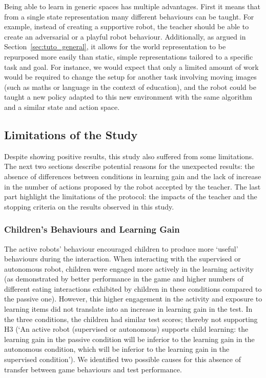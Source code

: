 Being able to learn in generic spaces has multiple advantages. First it means that from a single state representation many different behaviours can be taught. For example, instead of creating a supportive robot, the teacher should be able to create an adversarial or a playful robot behaviour. Additionally, as argued in Section~\ref{sec:tuto_general}, it allows for the world representation to be repurposed more easily than static, simple representations tailored to a specific task and goal. For instance, we would expect that only a limited amount of work would be required to change the setup for another task involving moving images (such as maths or language in the context of education), and the robot could be taught a new policy adapted to this new environment with the same algorithm and a similar state and action space. 

\subsection{Limitations of the Study}

Despite showing positive results, this study also suffered from some limitations. The next two sections describe potential reasons for the unexpected results: the absence of differences between conditions in learning gain and the lack of increase in the number of actions proposed by the robot accepted by the teacher. The last part highlight the limitations of the protocol: the impacts of the teacher and the stopping criteria on the results observed in this study.

\subsubsection{Children's Behaviours and Learning Gain}

The active robots' behaviour encouraged children to produce more `useful' behaviours during the interaction. When interacting with the supervised or autonomous robot, children were engaged more actively in the learning activity (as demonstrated by better performance in the game and higher numbers of different eating interactions exhibited by children in these conditions compared to the passive one). However, this higher engagement in the activity and exposure to learning items did not translate into an increase in learning gain in the test. In the three conditions, the children had similar test scores; thereby not supporting H3 (`An active robot (supervised or autonomous) supports child learning: the learning gain in the passive condition will be inferior to the learning gain in the autonomous condition, which will be inferior to the learning gain in the supervised condition'). We identified two possible causes for this absence of transfer between game behaviours and test performance. 

